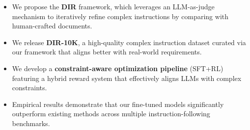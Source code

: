 \begin{itemize}[leftmargin=4mm]
    \item We propose the \textbf{DIR} framework, which leverages an LLM-as-judge mechanism to iteratively refine complex instructions by comparing with human-crafted documents.
    
    \item We release \textbf{DIR-10K}, a high-quality complex instruction dataset curated via our framework that aligns better with real-world requirements. 
    
    \item We develop a \textbf{constraint-aware optimization pipeline} (SFT+RL) featuring a hybrid reward system that effectively aligns LLMs with complex constraints.
    
    \item Empirical results demonstrate that our fine-tuned models significantly outperform existing methods across multiple instruction-following benchmarks.
\end{itemize}